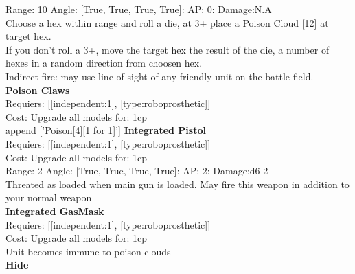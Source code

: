 Range: 10  Angle: [True, True, True, True]: AP: 0: Damage:N.A \\
Choose a hex within range and roll a die, at 3+ place a Poison Cloud [12] at target hex.\\ 
If you don't roll a 3+, move the target hex the result of the die, a number of hexes in a random direction from choosen hex.\\ 
Indirect fire: may use line of sight of any friendly unit on the battle field.\\ 






{\bf Poison Claws } \\

Requiers: [[independent:1], [type:roboprosthetic]] \\
Cost: Upgrade all models for: 1cp \\






append ['Poison[4][1 for 1]']
{\bf Integrated Pistol } \\

Requiers: [[independent:1], [type:roboprosthetic]] \\
Cost: Upgrade all models for: 1cp \\


Range: 2  Angle: [True, True, True, True]: AP: 2: Damage:d6-2 \\
Threated as loaded when main gun is loaded. May fire this weapon in addition to your normal weapon\\ 






{\bf Integrated GasMask } \\

Requiers: [[independent:1], [type:roboprosthetic]] \\
Cost: Upgrade all models for: 1cp \\
Unit becomes immune to poison clouds\\ 







{\bf Hide } \\

